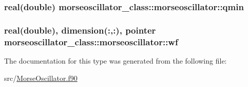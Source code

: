 \hypertarget{structmorseoscillator__class_1_1morseoscillator_afd9b3f7f865c19c374e0d36dcf8350b7}{
\subsubsection[{qmin}]{\setlength{\rightskip}{0pt plus 5cm}real(double) morseoscillator\+\_\+class\+::morseoscillator\+::qmin\hspace{0.3cm}{\ttfamily [private]}}}\label{structmorseoscillator__class_1_1morseoscillator_afd9b3f7f865c19c374e0d36dcf8350b7}
\hypertarget{structmorseoscillator__class_1_1morseoscillator_aaf0cdada0b811286eae65966d0773688}{
\subsubsection[{wf}]{\setlength{\rightskip}{0pt plus 5cm}real(double), dimension(\+:,\+:), pointer morseoscillator\+\_\+class\+::morseoscillator\+::wf\hspace{0.3cm}{\ttfamily [private]}}}\label{structmorseoscillator__class_1_1morseoscillator_aaf0cdada0b811286eae65966d0773688}


The documentation for this type was generated from the following file\+:\begin{DoxyCompactItemize}
\item 
src/\hyperlink{_morse_oscillator_8f90}{Morse\+Oscillator.\+f90}\end{DoxyCompactItemize}
